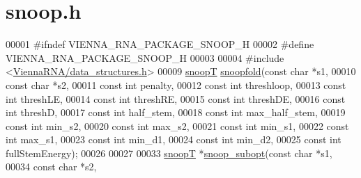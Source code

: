 \hypertarget{snoop_8h_source}{}\section{snoop.\+h}
\label{snoop_8h_source}

\begin{DoxyCode}
00001 \textcolor{preprocessor}{#ifndef VIENNA\_RNA\_PACKAGE\_SNOOP\_H}
00002 \textcolor{preprocessor}{#define VIENNA\_RNA\_PACKAGE\_SNOOP\_H}
00003 
00004 \textcolor{preprocessor}{#include <\mbox{\hyperlink{data__structures_8h}{ViennaRNA/data\_structures.h}}>}
00009 \mbox{\hyperlink{group__data__structures_structsnoop_t}{snoopT}} \mbox{\hyperlink{snoop_8h_a0a18e59395700bf89f9b8f596f5ae970}{snoopfold}}(\textcolor{keyword}{const} \textcolor{keywordtype}{char} *s1,
00010                  \textcolor{keyword}{const} \textcolor{keywordtype}{char} *s2,
00011                  \textcolor{keyword}{const} \textcolor{keywordtype}{int}  penalty,
00012                  \textcolor{keyword}{const} \textcolor{keywordtype}{int}  threshloop,
00013                  \textcolor{keyword}{const} \textcolor{keywordtype}{int}  threshLE,
00014                  \textcolor{keyword}{const} \textcolor{keywordtype}{int}  threshRE,
00015                  \textcolor{keyword}{const} \textcolor{keywordtype}{int}  threshDE,
00016                  \textcolor{keyword}{const} \textcolor{keywordtype}{int}  threshD,
00017                  \textcolor{keyword}{const} \textcolor{keywordtype}{int}  half\_stem,
00018                  \textcolor{keyword}{const} \textcolor{keywordtype}{int}  max\_half\_stem,
00019                  \textcolor{keyword}{const} \textcolor{keywordtype}{int}  min\_s2,
00020                  \textcolor{keyword}{const} \textcolor{keywordtype}{int}  max\_s2,
00021                  \textcolor{keyword}{const} \textcolor{keywordtype}{int}  min\_s1,
00022                  \textcolor{keyword}{const} \textcolor{keywordtype}{int}  max\_s1,
00023                  \textcolor{keyword}{const} \textcolor{keywordtype}{int}  min\_d1,
00024                  \textcolor{keyword}{const} \textcolor{keywordtype}{int}  min\_d2,
00025                  \textcolor{keyword}{const} \textcolor{keywordtype}{int}  fullStemEnergy);
00026 
00027 
00033 \mbox{\hyperlink{group__data__structures_structsnoop_t}{snoopT}} *\mbox{\hyperlink{snoop_8h_a61cbf896c7054f018f3e194efdc01bfd}{snoop\_subopt}}(\textcolor{keyword}{const} \textcolor{keywordtype}{char} *s1,
00034                      \textcolor{keyword}{const} \textcolor{keywordtype}{char} *s2,

\end{DoxyCode}
